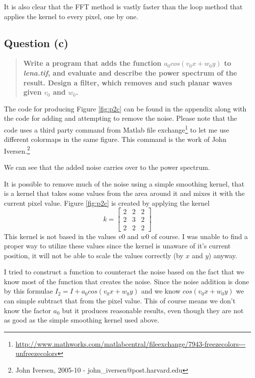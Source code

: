 It is also clear that the FFT method is vastly faster than the loop method that applies the kernel
to every pixel, one by one.

\subsection{Question (c)}
\begin{quote}
  \textbf{Write a program that adds the function $a_0cos(v_0x + w_0y)$ to
    \textit{lena.tif}, and evaluate and describe the power spectrum of the
    result. Design a filter, which removes and such planar waves given $v_0$ and
    $w_0$.}
\end{quote}

The code for producing Figure \ref{fig:p2c} can be found in the appendix along
with the code for adding and attempting to remove the noise. Please note that the code uses a third party command
from Matlab file exchange\footnote{\url{http://www.mathworks.com/matlabcentral/fileexchange/7943-freezecolors---unfreezecolors}}
to let me use different colormaps in the same figure. This command is the work of John Iversen.\footnote{John Iversen, 2005-10 - john\_iversen@post.harvard.edu}


We can see that the added noise carries over to the power spectrum.
  
It is possible to remove much of the noise using a simple smoothing kernel, that
is a kernel that takes some values from the area around it and mixes it with the
current pixel value. Figure \ref{fig:p2c} is created by applying the kernel
\[
    k = \begin{bmatrix}
            2 & 2 & 2 \\
            2 & 3 & 2 \\
            2 & 2 & 2
        \end{bmatrix}
\]
This kernel is not based in the values $v0$ and $w0$ of course. I was unable to
find a proper way to utilize these values since the kernel is unaware of it's
current position, it will not be able to scale the values correctly (by $x$ and
$y$) anyway.

I tried to construct a function to counteract the noise based on the fact that
we know most of the function that creates the noise. Since the noise addition is
done by this formulae $I_2 = I+a_0cos(v_0x + w_0y)$ and we know $cos(v_0x +
w_0y)$ we can simple subtract that from the pixel value. This of course means
we don't know the factor $a_0$ but it produces reasonable results, even though
they are not as good as the simple smoothing kernel used above.

